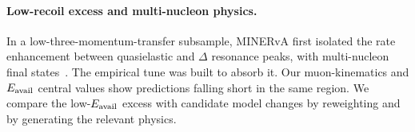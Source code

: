 \paragraph{Low-recoil excess and multi-nucleon physics.} In a low-three-momentum-transfer subsample, MINERvA first isolated the rate enhancement between quasielastic and $\Delta$ resonance peaks, with multi-nucleon final states~\cite{MINERvA:2016lowrecoil}. The empirical tune was built to absorb it. Our muon-kinematics and $E_{\mathrm{avail}}$ central values show predictions falling short in the same region. We compare the low-$E_{\mathrm{avail}}$ excess with candidate model changes by reweighting and by generating the relevant physics.

